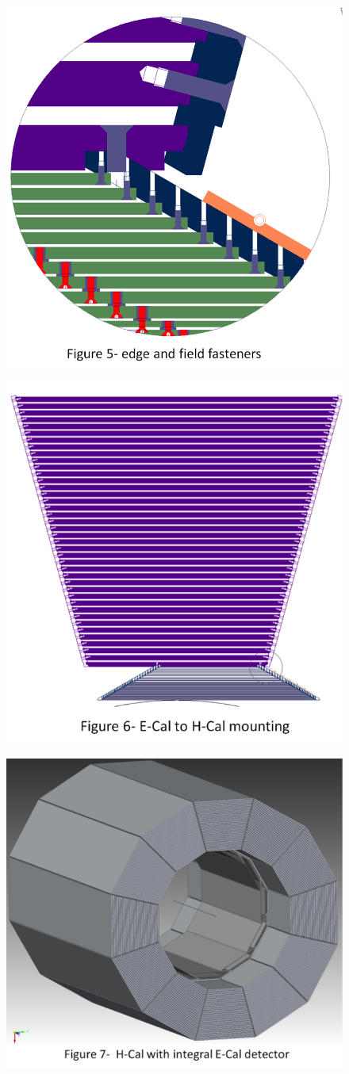 \begin{figure}
\includegraphics[width=.5\linewidth]{Calorimeter/SiliconTungstenSiD/edgeFasteners}
\end{figure}
\begin{figure}
\includegraphics[width=.5\linewidth]{Calorimeter/SiliconTungstenSiD/ecalMounting}
\end{figure}
\begin{figure}
\includegraphics[width=.5\linewidth]{Calorimeter/SiliconTungstenSiD/HCalECal}
\end{figure}
